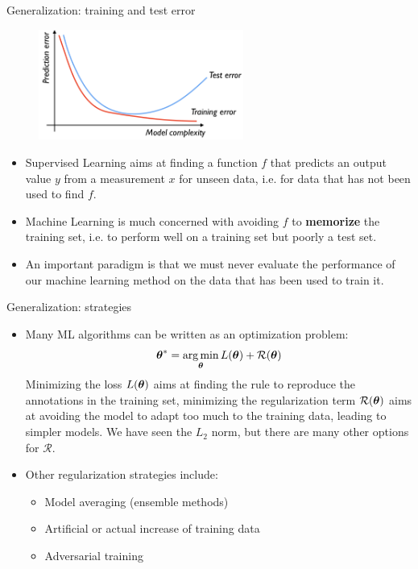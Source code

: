 \documentclass[xcolor=pdftex,dvipsnames,table]{beamer}
\begin{document}
\begin{frame}{Generalization: training and test error}
\begin{figure}[htb]
\includegraphics[width=0.6\textwidth]{../graphics/Training_and_test_error.png}
\end{figure}
\begin{itemize}
\item Supervised Learning aims at finding a function $f$ that predicts an output value $y$ from a measurement $x$ for unseen data, i.e. for data that has not been used to find $f$. 
\item Machine Learning is much concerned with avoiding $f$ to \textbf{memorize} the training set, i.e. to perform well on a training set but poorly a test set. 
\item An important paradigm is that we must never evaluate the performance of our machine learning method on the data that has been used to train it.
\end{itemize}
\end{frame}

\begin{frame}{Generalization: strategies}
\begin{itemize}
\item Many ML algorithms can be written as an optimization problem:
\begin{equation}
\boldsymbol{\theta} ^{\ast} = \operatorname*{arg\,min}_{\boldsymbol{\theta}} L (\boldsymbol{\theta}) + \mathcal{R}(\boldsymbol{\theta})
\end{equation}
Minimizing the loss $L (\boldsymbol{\theta})$ aims at finding the rule to reproduce the annotations in the training set, minimizing the regularization term $\mathcal{R}(\boldsymbol{\theta})$ aims at avoiding the model to adapt too much to the training data, leading to simpler models. We have seen the $L_2$ norm, but there are many other options for $\mathcal{R}$. 
\item Other regularization strategies include:
\begin{itemize}
\item Model averaging (ensemble methods)
\item Artificial or actual increase of training data
\item Adversarial training
\end{itemize}
\end{itemize}
\end{frame}
\end{document}
